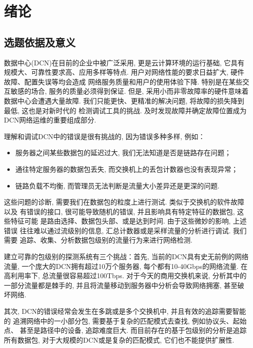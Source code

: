 ﻿%

\chapter{绪论}
\section{选题依据及意义}

  数据中心(DCN)在目前的企业中被广泛采用, 更是云计算环境的运行基础,
它具有规模大、可靠性要求高、应用多样等特点.
用户对网络性能的要求日益扩大, 硬件故障、配置失误等均会造成
网络服务质量和用户的使用体验下降.
特别是在某些交互敏感的场合, 服务的质量必须得到保证.
但是, 采用小而非零故障率的硬件意味着数据中心会遭遇大量故障.
我们只能更快、更精准的解决问题, 将故障的损失降到最低, 这也是对新时代的
检测调试工具的挑战. 及时发现故障并确定故障位置成为DCN网络运维的重要组成部分.

  理解和调试DCN中的错误是很有挑战的, 因为错误多种多样, 例如：
\begin{itemize}
  \setlength\itemsep{-0.3em}
  \item 服务器之间某些数据包的延迟过大, 我们无法知道是否是链路存在问题；
  \item 通往特定服务器的数据包丢失, 而交换机上的丢包计数器也没有表现异常；
  \item 链路负载不均衡, 而管理员无法判断是流量大小差异还是更深的问题.
\end{itemize}

  这些问题的诊断, 需要我们在数据包的粒度上进行测试. 类似于交换机的软件故障以及
有错误的接口, 很可能导致随机的错误, 并且影响具有特定特征的数据包, 这些特征可能
是路由选择、数据包头部、或是达到时间. 由于这些微妙的影响, 上述错误
往往难以通过流级别的信息, 汇总计数器或是采样流量的分析进行调试. 我们需要
追踪、收集、分析数据包级别的流量行为来进行网络检测.

建立可靠的包级别的探测系统有三个挑战：首先, 当前的DCN具有史无前例的网络流量,
一个庞大的DCN拥有超过10万个服务器, 每个都有10-40Gbps的网络流量. 在高利用率下,
总流量很容易超过100Tbps. 对于今天的商用交换机来说, 分析其中的一部分流量都是棘手的,
并且将流量移动到服务器中分析会导致网络拥塞, 甚至破坏网络.

其次, DCN的错误经常会发生在多跳或是多个交换机中, 并且有效的追踪需要智能的
追溯网络中的一小部分包, 需要基于复杂的匹配模式去查找, 例如协议头、起始点、
甚至是路径中的设备, 追踪难度巨大. 而目前存在的基于包级别的分析是追踪所有数据包,
对于大规模的DCN或是复杂的匹配模式, 它们也不能提供扩展性.


